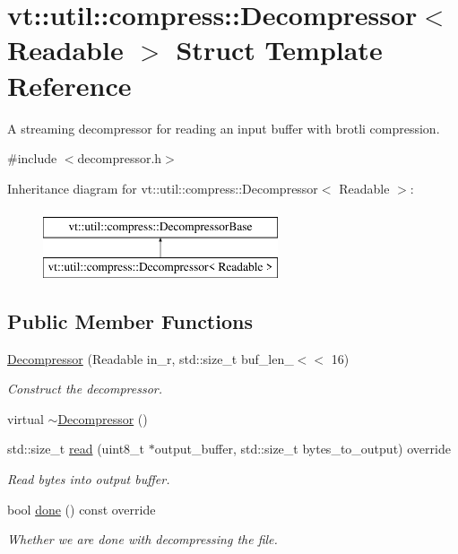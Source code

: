 \hypertarget{structvt_1_1util_1_1compress_1_1_decompressor}{}\section{vt\+:\+:util\+:\+:compress\+:\+:Decompressor$<$ Readable $>$ Struct Template Reference}
\label{structvt_1_1util_1_1compress_1_1_decompressor}


A streaming decompressor for reading an input buffer with brotli compression.  




{\ttfamily \#include $<$decompressor.\+h$>$}

Inheritance diagram for vt\+:\+:util\+:\+:compress\+:\+:Decompressor$<$ Readable $>$\+:\begin{figure}[H]
\begin{center}
\leavevmode
\includegraphics[height=2.000000cm]{structvt_1_1util_1_1compress_1_1_decompressor}
\end{center}
\end{figure}
\subsection*{Public Member Functions}
\begin{DoxyCompactItemize}
\item 
\hyperlink{structvt_1_1util_1_1compress_1_1_decompressor_aacf9c7d0a68ce970bd5219674f03c49b}{Decompressor} (Readable in\+\_\+r, std\+::size\+\_\+t buf\+\_\+len\+\_$<$$<$ 16)
\begin{DoxyCompactList}\small\item\em Construct the decompressor. \end{DoxyCompactList}\item 
virtual \hyperlink{structvt_1_1util_1_1compress_1_1_decompressor_a73d32684c506f355f425f3230dd5a7e7}{$\sim$\+Decompressor} ()
\item 
std\+::size\+\_\+t \hyperlink{structvt_1_1util_1_1compress_1_1_decompressor_a75d6946b3e1526fcf0cc6931f5e61774}{read} (uint8\+\_\+t $\ast$output\+\_\+buffer, std\+::size\+\_\+t bytes\+\_\+to\+\_\+output) override
\begin{DoxyCompactList}\small\item\em Read bytes into output buffer. \end{DoxyCompactList}\item 
bool \hyperlink{structvt_1_1util_1_1compress_1_1_decompressor_a68ee22d625a76f53fbda4b829863d01d}{done} () const override
\begin{DoxyCompactList}\small\item\em Whether we are done with decompressing the file. \end{DoxyCompactList}\end{DoxyCompactItemize}
